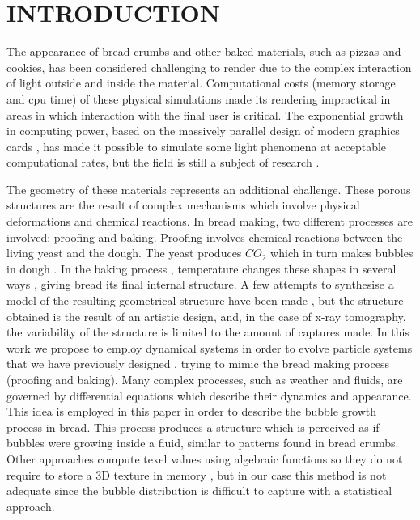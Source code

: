 \documentclass[oneside,a4paper,english,links]{amca}
\begin{document}
\section{INTRODUCTION}

The appearance of bread crumbs and other baked materials, such as
pizzas and cookies, has been considered challenging to render due to
the complex interaction of light outside and inside the
material. Computational costs (memory storage and cpu time) of these
physical simulations made its rendering impractical in areas in which
interaction with the final user is critical. The exponential growth in
computing power, based on the massively parallel design of modern
graphics cards \citep{Yeo09,Harris06}, has made it possible to
simulate some light phenomena at acceptable computational rates, but
the field is still a subject of research \citep{Voglsam2013}.

The geometry of these materials represents an additional challenge. These porous structures are the
result of complex mechanisms which involve physical deformations and
chemical reactions. In bread making, two different
processes are involved: proofing and baking. Proofing involves
chemical reactions between the living yeast and the dough. The yeast
produces $CO_{2}$ which in turn makes bubbles in dough
\citep{Shah1998}. In the baking process \citep{Mondal2008},
temperature changes these shapes in several ways \citep{Scanlon2001},
giving bread its final internal structure. A few attempts to
synthesise a model of the resulting geometrical structure have been
made \citep{VanDyck2014,Cho2007}, but the structure obtained is the
result of an artistic design, and, in the case of x-ray tomography,
the variability of the structure is limited to the amount of captures
made. In this work we propose to employ dynamical systems
\citep{Strogatz2001} in order to evolve particle systems
\citep{Reeves83} that we have previously designed
\citep{Baravalle2011}, trying to mimic the bread making process
(proofing and baking). Many complex processes, such as weather and
fluids, are governed by differential equations which describe their
dynamics and appearance. This idea is employed in this paper in order
to describe the bubble growth process in bread. This process produces a
structure which is perceived as if bubbles were growing inside a fluid,
similar to patterns found in bread crumbs. Other approaches compute
texel values using algebraic functions so they do not require to
store a 3D texture in memory \citep{Perlin1989}, but in our case this
method is not adequate since the bubble distribution is difficult to
capture with a statistical approach.
\end{document}
